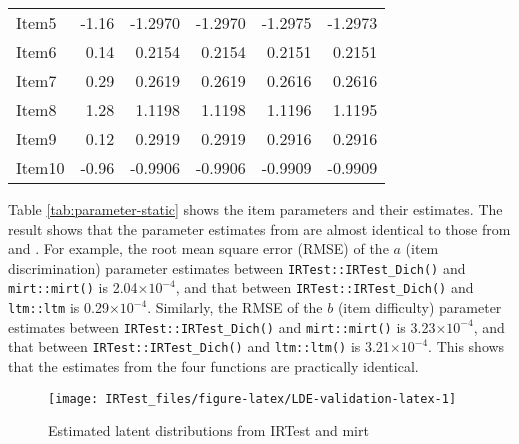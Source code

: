 \begin{table}
\begin{tabular}[t]{lrrrrr}
\hspace{1em}Item5 & -1.16 & -1.2970 & -1.2970 & -1.2975 & -1.2973\\
\hspace{1em}Item6 & 0.14 & 0.2154 & 0.2154 & 0.2151 & 0.2151\\
\hspace{1em}Item7 & 0.29 & 0.2619 & 0.2619 & 0.2616 & 0.2616\\
\hspace{1em}Item8 & 1.28 & 1.1198 & 1.1198 & 1.1196 & 1.1195\\
\hspace{1em}Item9 & 0.12 & 0.2919 & 0.2919 & 0.2916 & 0.2916\\
\hspace{1em}Item10 & -0.96 & -0.9906 & -0.9906 & -0.9909 & -0.9909\\
\bottomrule
\end{tabular}
\end{table}

Table
\ref{tab:parameter-static}
shows the item parameters and their estimates. The result shows that the
parameter estimates from  are almost identical to those from
 and . For example, the root mean square error (RMSE)
of the \(a\) (item discrimination) parameter estimates between
\texttt{IRTest::IRTest\_Dich()} and \texttt{mirt::mirt()} is
2.04\(\times 10^{-4}\),
and that between \texttt{IRTest::IRTest\_Dich()} and \texttt{ltm::ltm} is
0.29\(\times 10^{-4}\).
Similarly, the RMSE of the \(b\) (item difficulty)
parameter estimates between \texttt{IRTest::IRTest\_Dich()} and \texttt{mirt::mirt()} is
3.23\(\times 10^{-4}\),
and that between \texttt{IRTest::IRTest\_Dich()} and \texttt{ltm::ltm()} is
3.21\(\times 10^{-4}\).
This shows that the estimates from the four functions are
practically identical.

\begin{figure}[H]

{\centering \texttt{[image: IRTest\_files/figure-latex/LDE-validation-latex-1]} 

}

\caption{Estimated latent distributions from IRTest and mirt}\label{fig:LDE-validation-latex}
\end{figure}

